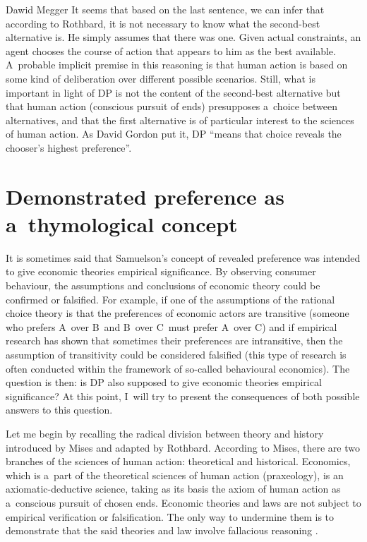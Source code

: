 \begin{artengenv}{Dawid Megger}
It seems that based on the last sentence, we can infer that according to Rothbard, it is not necessary to know what the second-best alternative is. He simply assumes that there was one. Given actual constraints, an agent chooses the course of action that appears to him as the best available. A~probable implicit premise in this reasoning is that human action is based on some kind of deliberation over different possible scenarios. Still, what is important in light of DP is not the content of the second-best alternative but that human action (conscious pursuit of ends) presupposes a~choice between alternatives, and that the first alternative is of particular interest to the sciences of human action. As David Gordon 
\parencite*[][]{gordon_misunderstanding_2022} %
 put it, DP ``means that choice reveals the chooser's highest preference''.



\section{Demonstrated preference as a~thymological concept}

It is sometimes said that Samuelson's concept of revealed preference was intended to give economic theories empirical significance. By observing consumer behaviour, the assumptions and conclusions of economic theory could be confirmed or falsified. For example, if one of the assumptions of the rational choice theory is that the preferences of economic actors are transitive (someone who prefers A~over B~and B~over C~must prefer A~over C) and if empirical research has shown that sometimes their preferences are intransitive, then the assumption of transitivity could be considered falsified (this type of research is often conducted within the framework of so-called behavioural economics). The question is then: is DP also supposed to give economic theories empirical significance? At this point, I~will try to present the consequences of both possible answers to this question.



Let me begin by recalling the radical division between theory and history introduced by Mises and adapted by Rothbard. According to Mises, there are two branches of the sciences of human action: theoretical and historical. Economics, which is a~part of the theoretical sciences of human action (praxeology), is an axiomatic-deductive science, taking as its basis the axiom of human action as a~conscious pursuit of chosen ends. Economic theories and laws are not subject to empirical verification or falsification. The only way to undermine them is to demonstrate that the said theories and law involve fallacious reasoning 
\parencite[cf.][pp.30–41]{mises_human_1998}.%





\end{artengenv}
